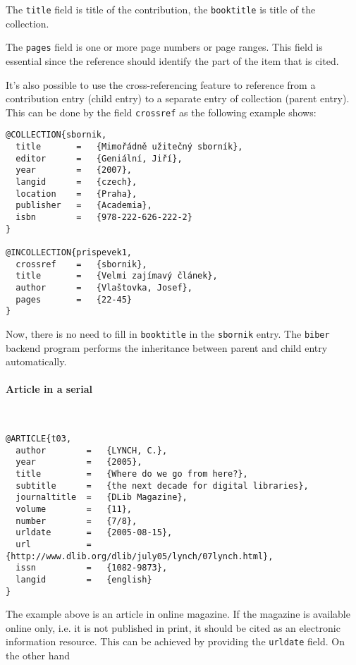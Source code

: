 \documentclass[a4paper,10pt]{ltxdockit}
\def\t|#1|{\texttt{#1}}
\def\c#1{%
\hangpara{3em}{1}%
\fullcite{#1}}
\begin{document}
The \t|title| field is title of the contribution, the \t|booktitle|
is title of the collection.

The \t|pages| field is one or more page numbers or page ranges. This field
is essential since the reference should identify the part of the item
that is cited.

It's also possible to use the cross-referencing feature to reference
from a contribution entry (child entry) to a separate entry of collection
(parent entry). This can be done by the field \t|crossref|
as the following example shows:
\newline

\noindent\c{prispevek1}
 
\begin{verbatim}
@COLLECTION{sbornik,
  title       =   {Mimořádně užitečný sborník},
  editor      =   {Geniální, Jiří},
  year        =   {2007},
  langid      =   {czech},
  location    =   {Praha},
  publisher   =   {Academia},
  isbn        =   {978-222-626-222-2}
}

@INCOLLECTION{prispevek1,
  crossref    =   {sbornik},
  title       =   {Velmi zajímavý článek},
  author      =   {Vlaštovka, Josef},
  pages       =   {22-45}
}
\end{verbatim}

Now, there is no need to fill in \t|booktitle| in the \t|sbornik| entry.
The \t|biber| backend program performs the inheritance between parent and
child entry automatically.

\paragraph{Article in a serial}\hfill\\

\c{t03}
\begin{verbatim}
@ARTICLE{t03,
  author        =   {LYNCH, C.},
  year          =   {2005},
  title         =   {Where do we go from here?},
  subtitle      =   {the next decade for digital libraries},
  journaltitle  =   {DLib Magazine},
  volume        =   {11},
  number        =   {7/8},
  urldate       =   {2005-08-15},
  url           =   {http://www.dlib.org/dlib/july05/lynch/07lynch.html}, 
  issn          =   {1082-9873},
  langid        =   {english}
}
\end{verbatim}

The example above is an article in online magazine. If the magazine
is available online only, i.e. it is not published in print,
it should be cited as an electronic information resource. This can be
achieved by providing the \t|urldate| field. On the other hand
\newline
\end{document}

